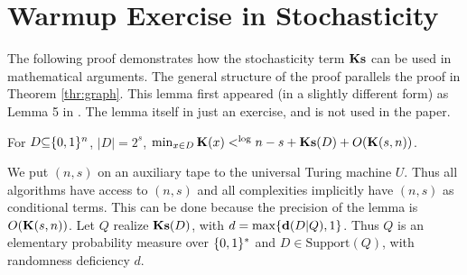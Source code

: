 \documentclass[11pt]{article}\textwidth 6.5in\textheight 9in
\begin{document}
\section{Warmup Exercise in Stochasticity}
\label{sec:exerstoc}
The following proof demonstrates how the stochasticity term $\mathbf{Ks}$ can be used in mathematical arguments. The general structure of the proof parallels the proof in Theorem \ref{thr:graph}. This lemma first appeared (in a slightly different form) as Lemma 5 in \cite{EpsteinNoteOutliers21}. The lemma itself in just an exercise, and is not used in the paper.
\begin{lmm}
	\label{lmm:stochasticity}
	For $D{\subseteq} \{0,1\}^n$, $|D|{=}2^s$, $\min_{x\in D}{\mathbf K}(x)<^{\log} n-s+\mathbf{Ks}(D)+O({\mathbf K}(s,n))$.
\end{lmm}
\begin{prf}

We put $(n,s)$ on an auxiliary tape to the universal Turing machine $U$. Thus all algorithms have access to $(n,s)$ and all complexities implicitly have $(n,s)$ as conditional terms. This can be done because the precision of the lemma is $O({\mathbf K}(s,n))$. Let $Q$ realize $\mathbf{Ks}(D)$, with $d=\max\{{\mathbf d}(D|Q),1\}$. Thus $Q$ is an elementary probability measure over $\{0,1\}^*$ and $D\in\mathrm{Support}(Q)$, with randomness deficiency $d$.


\end{prf}
\end{document}
